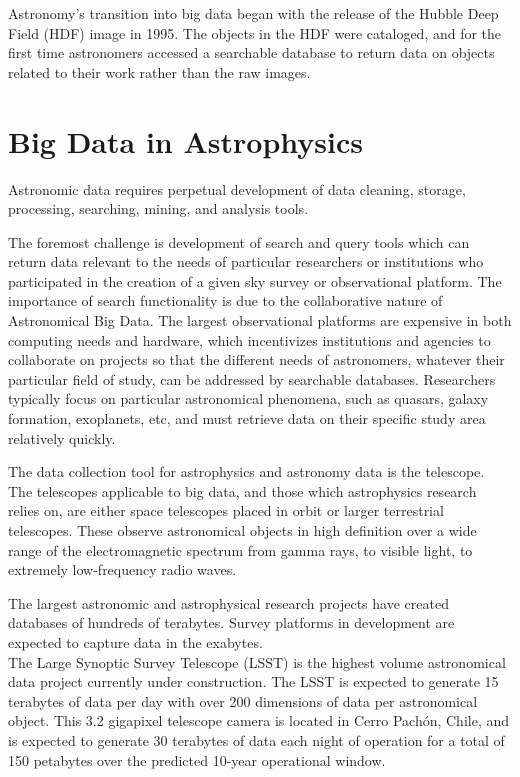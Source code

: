 \documentclass[sigconf]{acmart}
\begin{document}
Astronomy's transition into big data began with the release of the Hubble Deep Field (HDF) image in 1995\cite{Andersen2012}. The objects in the HDF were cataloged, and for the first time astronomers accessed a searchable database to return data on objects related to their work rather than the raw images. 

\section{Big Data in Astrophysics}
Astronomic data requires perpetual development of data cleaning, storage, processing, searching, mining, and analysis tools\cite{Borne2014}. 

The foremost challenge is development of search and query tools which can return data relevant to the needs of particular researchers or institutions who participated in the creation of a given sky survey or observational platform. The importance of search functionality is due to the collaborative nature of Astronomical Big Data. The largest observational platforms are expensive in both computing needs and hardware, which incentivizes institutions and agencies to collaborate on projects so that the different needs of astronomers, whatever their particular field of study, can be addressed by searchable databases. Researchers typically focus on particular astronomical phenomena, such as quasars, galaxy formation, exoplanets, etc, and must retrieve data on their specific study area relatively quickly. 

The data collection tool for astrophysics and astronomy data is the telescope. The telescopes applicable to big data, and those which astrophysics research relies on, are either space telescopes placed in orbit or larger terrestrial telescopes. These observe astronomical objects in high definition over a wide range of the electromagnetic spectrum from gamma rays, to visible light, to extremely low-frequency radio waves\cite{DR12017}. 

The largest astronomic and astrophysical research projects have created databases of hundreds of terabytes. Survey platforms in development are expected to capture data in the exabytes\cite{Newman2011,Trader2014,Zhang2015}. \\

The Large Synoptic Survey Telescope (LSST) is the highest volume astronomical data project currently under construction. The LSST is expected to generate 15 terabytes of data per day with over 200 dimensions of data per astronomical object\cite{LSSTRank}. This 3.2 gigapixel telescope camera is located in Cerro Pachón, Chile, and is expected to generate 30 terabytes of data each night of operation for a total of 150 petabytes over the predicted 10-year operational window\cite{EPO}. 
\end{document}
